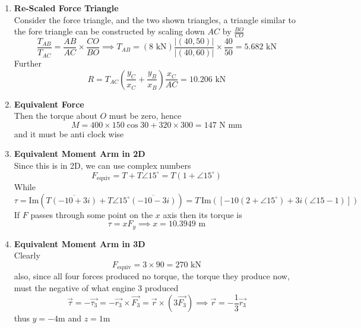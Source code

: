 \documentclass[12pt]{article}
\begin{document}
\begin{enumerate}
\item \textbf{Re-Scaled Force Triangle} \\
Consider the force triangle, and the two shown triangles, a triangle similar to the fore triangle can be constructed by scaling down $AC$ by $\frac{BO}{CO}$
$$
\frac{T_{AB}}{T_{AC}} = \frac{AB}{AC}\times \frac{CO}{BO} \implies T_{AB} = (8 \text{ kN}) \frac{|(40,50)|}{|(40, 60)|} \times \frac{40}{50}= 5.682 \text{ kN}
$$
Further
$$
R = T_{AC} \left( \frac{y_{C}}{x_{C}} + \frac{y_{B}}{x_{B}} \right) \frac{x_{C}}{AC} = 10.206 \text{ kN}
$$

\item \textbf{Equivalent Force} \\
Then the torque about $O$ must be zero, hence
$$
M = 400 \times 150 \cos 30 + 320 \times 300 = 147 \text{ N mm}
$$
and it must be anti clock wise
\item \textbf{Equivalent Moment Arm in 2D} \\
Since this is in 2D, we can use complex numbers
$$
F_{\text{equiv}} = T + T \angle 15^{\circ} = T(1 + \angle 15^{\circ})
$$
While
$$
\tau = \mathrm{Im}(T \overline{(-10 + 3i)} + T\angle 15^{\circ} \overline{(-10 -3i)}) = T\,\mathrm{Im}([-10(2 + \angle 15^{\circ}) + 3i(\angle 15-1)])
$$
If $F$ passes through some point on the $x$ axis then its torque is
$$
\tau = xF_{y} \implies x = 10.3949 \text{ m} 
$$


\item \textbf{Equivalent Moment Arm in 3D} \\
Clearly 
$$
F_{\text{equiv}} = 3\times 90  =270 \text{ kN}
$$
also, since all four forces produced no torque, the torque they produce now, must the negative of what engine 3 produced
$$
\vec{\tau} = -\vec{\tau_{3}} = -\vec{r_{3}}\times \vec{F_{3}} = \vec{r}\times(3\vec{F_{3}}) \implies \vec{r} = -\frac{1}{3}\vec{r_{3}}
$$
thus $y = -4\text{m}$ and $z = 1\text{m}$
\end{enumerate}
\end{document}
